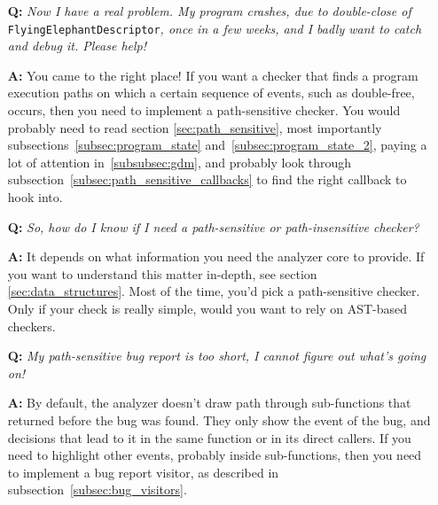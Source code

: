 \documentclass[a4paper,12pt]{article}
\newenvironment{nobr}{\begin{minipage}{\textwidth}\setlength\parskip{1em}
}{\end{minipage}\ignorespacesafterend}
\begin{document}
\begin{nobr}
\begin{itemize}
\item[\textbf{Q:}] \emph{Now I have a real problem. My program crashes, due to double-close of} \lstinline|FlyingElephantDescriptor|\emph{, once in a few weeks, and I badly want to catch and debug it. Please help!}
\item[\textbf{A:}] You came to the right place! If you want a checker that finds a program execution paths on which a certain sequence of events, such as double-free, occurs, then you need to implement a path-sensitive checker. You would probably need to read section \ref{sec:path_sensitive}, most importantly subsections~\ref{subsec:program_state} and~\ref{subsec:program_state_2}, paying a lot of attention in~\ref{subsubsec:gdm}, and probably look through subsection~\ref{subsec:path_sensitive_callbacks} to find the right callback to hook into.
\end{itemize}
\medskip
\end{nobr}

\begin{nobr}
\begin{itemize}
\item[\textbf{Q:}] \emph{So, how do I know if I need a path-sensitive or path-insensitive checker?}
\item[\textbf{A:}] It depends on what information you need the analyzer core to provide. If you want to understand this matter in-depth, see section \ref{sec:data_structures}. Most of the time, you'd pick a path-sensitive checker. Only if your check is really simple, would you want to rely on AST-based checkers.
\end{itemize}
\medskip
\end{nobr}

\begin{nobr}
\begin{itemize}
\item[\textbf{Q:}] \emph{My path-sensitive bug report is too short, I cannot figure out what's going on!}
\item[\textbf{A:}] By default, the analyzer doesn't draw path through sub-functions that returned before the bug was found. They only show the event of the bug, and decisions that lead to it in the same function or in its direct callers. If you need to highlight other events, probably inside sub-functions, then you need to implement a bug report visitor, as described in subsection~\ref{subsec:bug_visitors}.
\end{itemize}
\medskip
\end{nobr}
\end{document}
